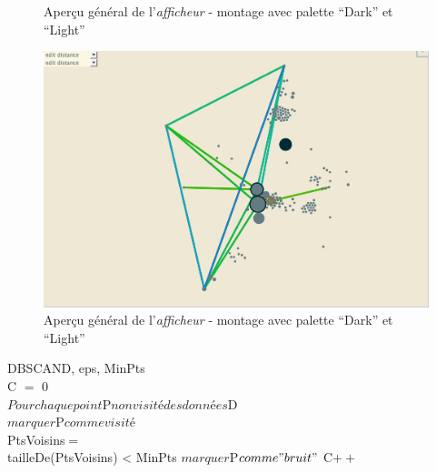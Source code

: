 \documentclass[12pt]{report}
\begin{document}
\begin{spacing}{1.2}
\begin{figure}[h]
\begin{center}
\end{center}
\caption{Aperçu général de l'\textit{afficheur} - montage avec palette ``Dark'' et ``Light''}
\end{figure}

\begin{figure}[h]
\begin{center}
	\includegraphics[scale=0.6]{img/Edit-Distance-Ex.jpg}
\end{center}
\caption{Aperçu général de l'\textit{afficheur} - montage avec palette ``Dark'' et ``Light''}
\end{figure}

\begin{pseudocode}{DBSCAN}{D, eps, MinPts}
\\
C $=$ 0\\
$Pour chaque point $P$ non visité des données $D\\
$marquer $P$ comme visité$\\
PtsVoisins$ = $\\
\IF tailleDe(PtsVoisins) < MinPts
\THEN $marquer $P$ comme "bruit"$
\ELSE 
	\BEGIN
		C$++$\\
		\\
	\END\\
\\


\end{pseudocode}
\end{spacing}
\end{document}
